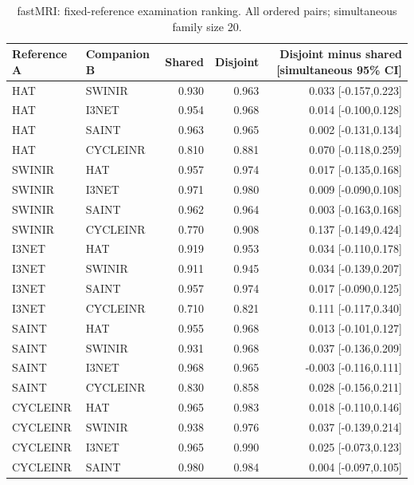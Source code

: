 \begin{table}[t]\centering\small
\caption{fastMRI: fixed-reference examination ranking. All ordered pairs; simultaneous family size 20.}
\begin{tabular}{llrrr}\toprule Reference A & Companion B & Shared & Disjoint & Disjoint minus shared [simultaneous 95\% CI]\\\midrule
HAT & SWINIR & 0.930 & 0.963 & 0.033 [-0.157,0.223] \\
HAT & I3NET & 0.954 & 0.968 & 0.014 [-0.100,0.128] \\
HAT & SAINT & 0.963 & 0.965 & 0.002 [-0.131,0.134] \\
HAT & CYCLEINR & 0.810 & 0.881 & 0.070 [-0.118,0.259] \\
SWINIR & HAT & 0.957 & 0.974 & 0.017 [-0.135,0.168] \\
SWINIR & I3NET & 0.971 & 0.980 & 0.009 [-0.090,0.108] \\
SWINIR & SAINT & 0.962 & 0.964 & 0.003 [-0.163,0.168] \\
SWINIR & CYCLEINR & 0.770 & 0.908 & 0.137 [-0.149,0.424] \\
I3NET & HAT & 0.919 & 0.953 & 0.034 [-0.110,0.178] \\
I3NET & SWINIR & 0.911 & 0.945 & 0.034 [-0.139,0.207] \\
I3NET & SAINT & 0.957 & 0.974 & 0.017 [-0.090,0.125] \\
I3NET & CYCLEINR & 0.710 & 0.821 & 0.111 [-0.117,0.340] \\
SAINT & HAT & 0.955 & 0.968 & 0.013 [-0.101,0.127] \\
SAINT & SWINIR & 0.931 & 0.968 & 0.037 [-0.136,0.209] \\
SAINT & I3NET & 0.968 & 0.965 & -0.003 [-0.116,0.111] \\
SAINT & CYCLEINR & 0.830 & 0.858 & 0.028 [-0.156,0.211] \\
CYCLEINR & HAT & 0.965 & 0.983 & 0.018 [-0.110,0.146] \\
CYCLEINR & SWINIR & 0.938 & 0.976 & 0.037 [-0.139,0.214] \\
CYCLEINR & I3NET & 0.965 & 0.990 & 0.025 [-0.073,0.123] \\
CYCLEINR & SAINT & 0.980 & 0.984 & 0.004 [-0.097,0.105] \\
\bottomrule\end{tabular}\end{table}
